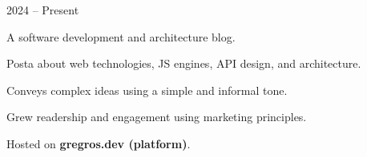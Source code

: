 \begin{project}{\textbf{\gregrosdev}\https{\mywebsite}}{2024 -- Present}
\item A software development and architecture blog.
\item Posta about web technologies, JS engines, API design, and architecture.
\item Conveys complex ideas using a simple and informal tone.
\item Grew readership and engagement using marketing principles.
\item Hosted on \textbf{gregros.dev (platform)}.
\end{project}
